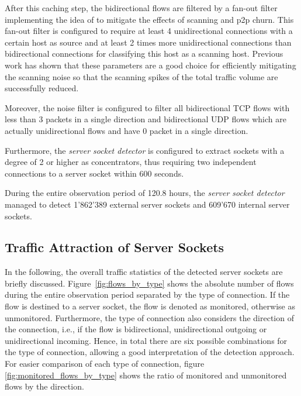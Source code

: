 After this caching step, the bidirectional flows are filtered by a fan-out filter implementing the idea of \citet{Allman:2007} to mitigate the effects of scanning and \gls{p2p} churn. 
This fan-out filter is configured to require at least 4 unidirectional connections with a certain host as source and at least 2 times more unidirectional connections than bidirectional connections for classifying this host as a scanning host. 
Previous work\citep{Schatzmann:Mining,Schatzmann:Dissection, Schatzmann:Tracing} has shown that these parameters are a good choice for efficiently mitigating the scanning noise so that the scanning spikes of the total traffic volume are successfully reduced.

Moreover, the noise filter is configured to filter all bidirectional \gls{TCP} flows with less than 3 packets in a single direction and bidirectional \gls{UDP} flows which are actually unidirectional flows and have 0 packet in a single direction.

Furthermore, the \emph{server socket detector} is configured to extract sockets with a degree of 2 or higher as concentrators, thus requiring two independent connections to a \gls{server socket} within 600 seconds.

During the entire observation period of 120.8 hours, the \emph{server socket detector} managed to detect 1'862'389 external \glspl{server socket} and 609'670 internal \glspl{server socket}.

\subsection{Traffic Attraction of Server Sockets}

In the following, the overall traffic statistics of the detected \glspl{server socket} are briefly discussed. Figure \ref{fig:flows_by_type} shows the absolute number of flows during the entire observation period separated by the type of connection. 
If the flow is destined to a \gls{server socket}, the flow is denoted as monitored, otherwise as unmonitored. 
Furthermore, the type of connection also considers the direction of the connection, i.e., if the flow is bidirectional, unidirectional outgoing or unidirectional incoming. 
Hence, in total there are six possible combinations for the type of connection, allowing a good interpretation of the detection approach. 
For easier comparison of each type of connection, figure \ref{fig:monitored_flows_by_type} shows the ratio of monitored and unmonitored flows by the direction.

